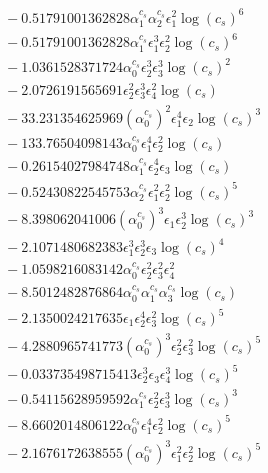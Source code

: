 \documentclass[10pt]{article}
\begin{document}
\begin{align*}
&{}  - 0.51791001362828 \alpha_{1}^{c_s} \alpha_{2}^{c_s} \epsilon_{1}^{2} \log{\left(c_{s} \right)}^{6} \\
&{}  - 0.51791001362828 \alpha_{1}^{c_s} \epsilon_{1}^{3} \epsilon_{2}^{2} \log{\left(c_{s} \right)}^{6} \\
&{}  - 1.0361528371724 \alpha_{0}^{c_s} \epsilon_{2}^{3} \epsilon_{3}^{3} \log{\left(c_{s} \right)}^{2} \\
&{}  - 2.0726191565691 \epsilon_{2}^{2} \epsilon_{3}^{3} \epsilon_{4}^{2} \log{\left(c_{s} \right)} \\
&{}  - 33.231354625969 \left(\alpha_{0}^{c_s}\right)^{2} \epsilon_{1}^{4} \epsilon_{2} \log{\left(c_{s} \right)}^{3} \\
&{}  - 133.76504098143 \alpha_{0}^{c_s} \epsilon_{1}^{4} \epsilon_{2}^{2} \log{\left(c_{s} \right)} \\
&{}  - 0.26154027984748 \alpha_{1}^{c_s} \epsilon_{2}^{4} \epsilon_{3} \log{\left(c_{s} \right)} \\
&{}  - 0.52430822545753 \alpha_{2}^{c_s} \epsilon_{1}^{2} \epsilon_{2}^{2} \log{\left(c_{s} \right)}^{5} \\
&{}  - 8.398062041006 \left(\alpha_{0}^{c_s}\right)^{3} \epsilon_{1} \epsilon_{2}^{3} \log{\left(c_{s} \right)}^{3} \\
&{}  - 2.1071480682383 \epsilon_{1}^{3} \epsilon_{2}^{3} \epsilon_{3} \log{\left(c_{s} \right)}^{4} \\
&{}  - 1.0598216083142 \alpha_{0}^{c_s} \epsilon_{2}^{2} \epsilon_{3}^{2} \epsilon_{4}^{2} \\
&{}  - 8.5012482876864 \alpha_{0}^{c_s} \alpha_{1}^{c_s} \alpha_{3}^{c_s} \log{\left(c_{s} \right)} \\
&{}  - 2.1350024217635 \epsilon_{1} \epsilon_{2}^{4} \epsilon_{3}^{2} \log{\left(c_{s} \right)}^{5} \\
&{}  - 4.2880965741773 \left(\alpha_{0}^{c_s}\right)^{3} \epsilon_{2}^{2} \epsilon_{3}^{2} \log{\left(c_{s} \right)}^{5} \\
&{}  - 0.033735498715413 \epsilon_{2}^{3} \epsilon_{3} \epsilon_{4}^{3} \log{\left(c_{s} \right)}^{5} \\
&{}  - 0.54115628959592 \alpha_{1}^{c_s} \epsilon_{2}^{2} \epsilon_{3}^{3} \log{\left(c_{s} \right)}^{3} \\
&{}  - 8.6602014806122 \alpha_{0}^{c_s} \epsilon_{1}^{4} \epsilon_{2}^{2} \log{\left(c_{s} \right)}^{5} \\
&{}  - 2.1676172638555 \left(\alpha_{0}^{c_s}\right)^{3} \epsilon_{1}^{2} \epsilon_{2}^{2} \log{\left(c_{s} \right)}^{5} \\

\end{align*}
\end{document}
